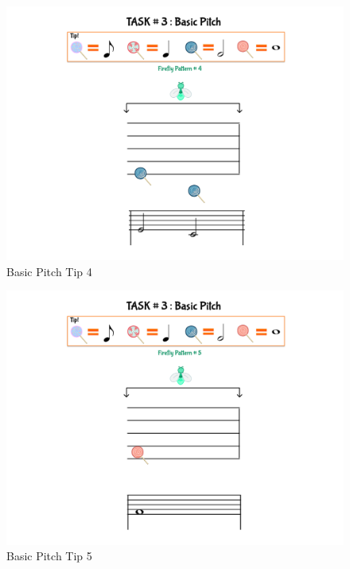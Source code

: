 \begin{figure}[H]
    \centering
    \includegraphics[width=12cm]{figures/NewFigures/BasicPitchTip4.png}
    \caption{Basic Pitch Tip 4}
    \label{fig:BasicPitchTip4}
\end{figure}

\begin{figure}[H]
    \centering
    \includegraphics[width=12cm]{figures/NewFigures/BasicPitchTip5.png}
    \caption{Basic Pitch Tip 5}
    \label{fig:BasicPitchTip5}
\end{figure}


